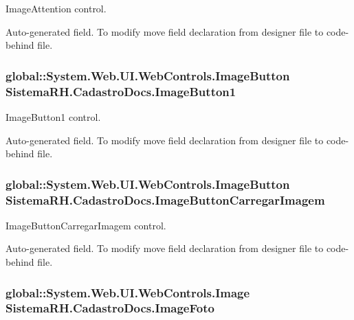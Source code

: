 ImageAttention control. 

Auto-\/generated field. To modify move field declaration from designer file to code-\/behind file. \hypertarget{class_sistema_r_h_1_1_cadastro_docs_a5362587404827e8c273c3b1be13fc7c5}{
\subsubsection[{ImageButton1}]{\setlength{\rightskip}{0pt plus 5cm}global::System.Web.UI.WebControls.ImageButton {\bf SistemaRH.CadastroDocs.ImageButton1}}}
\label{class_sistema_r_h_1_1_cadastro_docs_a5362587404827e8c273c3b1be13fc7c5}


ImageButton1 control. 

Auto-\/generated field. To modify move field declaration from designer file to code-\/behind file. \hypertarget{class_sistema_r_h_1_1_cadastro_docs_af52f4cd36a77912ec94cbc5a65c73459}{
\subsubsection[{ImageButtonCarregarImagem}]{\setlength{\rightskip}{0pt plus 5cm}global::System.Web.UI.WebControls.ImageButton {\bf SistemaRH.CadastroDocs.ImageButtonCarregarImagem}}}
\label{class_sistema_r_h_1_1_cadastro_docs_af52f4cd36a77912ec94cbc5a65c73459}


ImageButtonCarregarImagem control. 

Auto-\/generated field. To modify move field declaration from designer file to code-\/behind file. \hypertarget{class_sistema_r_h_1_1_cadastro_docs_a748c60b96b57bea687b23ee1d0645437}{
\subsubsection[{ImageFoto}]{\setlength{\rightskip}{0pt plus 5cm}global::System.Web.UI.WebControls.Image {\bf SistemaRH.CadastroDocs.ImageFoto}}}
\label{class_sistema_r_h_1_1_cadastro_docs_a748c60b96b57bea687b23ee1d0645437}


